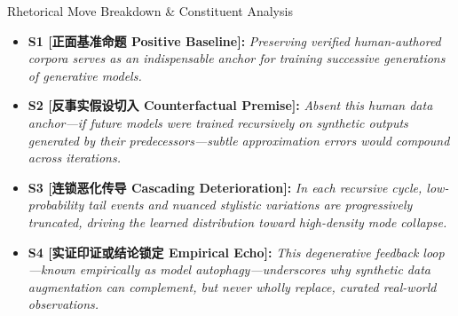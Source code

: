 \begin{TipBox}{Rhetorical Move Breakdown \& Constituent Analysis}
\begin{itemize}[leftmargin=1.5em]
  \item \textbf{S1 [正面基准命题 Positive Baseline]:} \textit{Preserving verified human-authored corpora serves as an indispensable anchor for training successive generations of generative models.}\par{}
  \item \textbf{S2 [反事实假设切入 Counterfactual Premise]:} \textit{Absent this human data anchor---if future models were trained recursively on synthetic outputs generated by their predecessors---subtle approximation errors would compound across iterations.}\par{}
  \item \textbf{S3 [连锁恶化传导 Cascading Deterioration]:} \textit{In each recursive cycle, low-probability tail events and nuanced stylistic variations are progressively truncated, driving the learned distribution toward high-density mode collapse.}\par{}
  \item \textbf{S4 [实证印证或结论锁定 Empirical Echo]:} \textit{This degenerative feedback loop---known empirically as model autophagy---underscores why synthetic data augmentation can complement, but never wholly replace, curated real-world observations.}\par{}
\end{itemize}
\end{TipBox}
\medskip

